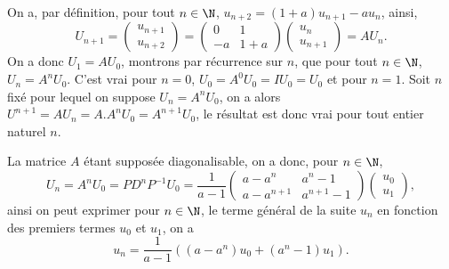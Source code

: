 {\begin{enumerate}
{On a, par d\'efinition, pour tout $n\in\N$, $u_{n+2}=(1+a)u_{n+1}-au_n$, ainsi, 
$$U_{n+1}=\begin{pmatrix}u_{n+1} \\  u_{n+2}\end{pmatrix}=\begin{pmatrix}0&1 \\  -a&1+a\end{pmatrix}\begin{pmatrix}u_{n} \\  u_{n+1}\end{pmatrix}=AU_n.$$
On a donc $U_1=AU_0$, montrons par r\'ecurrence sur $n$, que pour tout $n\in\N$, $U_n=A^nU_0$. C'est vrai pour $n=0$, $U_0=A^0U_0=IU_0=U_0$ et pour $n=1$. Soit $n$ fix\'e pour lequel on suppose $U_n=A^nU_0$, on a alors $U^{n+1}=AU_n=A.A^nU_0=A^{n+1}U_0$, le r\'esultat est donc vrai pour tout entier naturel $n$.

La matrice $A$ \'etant suppos\'ee diagonalisable, on a donc, pour $n\in\N$,
$$U_n=A^nU_0=PD^nP^{-1}U_0={\frac {1}{a-1}}\begin{pmatrix}a-a^n&a^n-1 \\  a-a^{n+1}&a^{n+1}-1\end{pmatrix}\begin{pmatrix}u_{0} \\  u_{1}\end{pmatrix},$$
ainsi on peut exprimer pour $n\in\N$, le terme g\'en\'eral de la suite $u_n$ en fonction des premiers termes $u_0$ et $u_1$, on a 
$$u_n={\frac{1} {a-1}}\left((a-a^n)u_0+(a^n-1)u_1\right).$$}
\end{enumerate}
}
